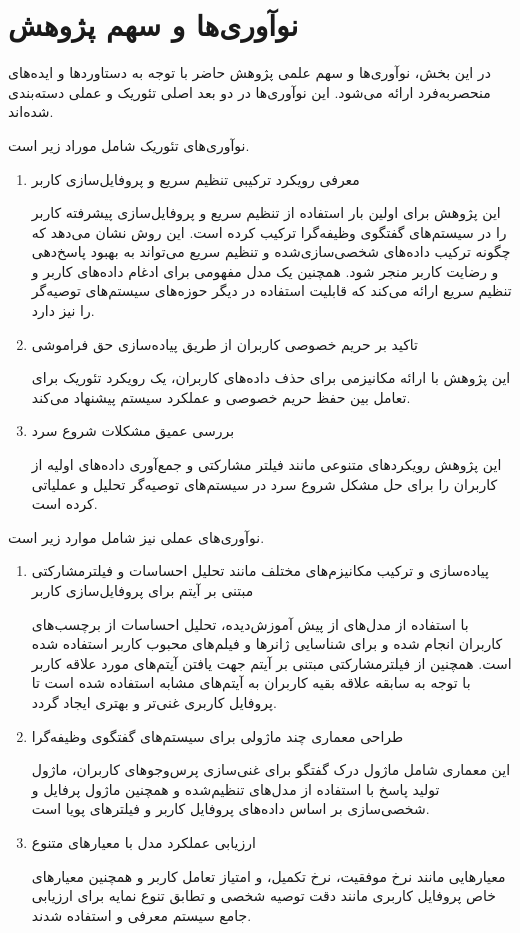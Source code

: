 \section{نوآوری‌ها و سهم پژوهش}

در این بخش، نوآوری‌ها و سهم علمی پژوهش حاضر با توجه به دستاوردها و ایده‌های منحصربه‌فرد ارائه می‌شود. این نوآوری‌ها در دو بعد اصلی تئوریک و عملی دسته‌بندی شده‌اند.


نوآوری‌های تئوریک شامل موراد زیر است.
\begin{enumerate}
\item
معرفی رویکرد ترکیبی تنظیم سریع و پروفایل‌سازی کاربر

این پژوهش برای اولین بار استفاده از تنظیم سریع و پروفایل‌سازی پیشرفته کاربر را در سیستم‌های گفتگوی وظیفه‌گرا ترکیب کرده است. این روش نشان می‌دهد که چگونه ترکیب داده‌های شخصی‌سازی‌شده و تنظیم سریع می‌تواند به بهبود پاسخ‌دهی و رضایت کاربر منجر شود. همچنین یک مدل مفهومی برای ادغام داده‌های کاربر و تنظیم سریع ارائه می‌کند که قابلیت استفاده در دیگر حوزه‌های سیستم‌های توصیه‌گر را نیز دارد.
\item
تاکید بر حریم خصوصی کاربران از طریق پیاده‌سازی حق فراموشی

این پژوهش با ارائه مکانیزمی برای حذف داده‌های کاربران، یک رویکرد تئوریک برای تعامل بین حفظ حریم خصوصی و عملکرد سیستم پیشنهاد می‌کند.

\item
بررسی عمیق مشکلات شروع سرد

این پژوهش رویکردهای متنوعی مانند فیلتر مشارکتی و جمع‌آوری داده‌های اولیه از کاربران را برای حل مشکل شروع سرد در سیستم‌های توصیه‌گر تحلیل و عملیاتی کرده است.
\end{enumerate}



نوآوری‌های عملی نیز شامل موارد زیر است.
\begin{enumerate}
\item
پیاده‌سازی و ترکیب مکانیزم‌های مختلف مانند تحلیل احساسات و فیلترمشارکتی مبتنی بر آیتم برای پروفایل‌سازی کاربر

با استفاده از مدل‌های از پیش آموزش‌دیده، تحلیل احساسات از برچسب‌های کاربران انجام شده و برای شناسایی ژانرها و فیلم‌های محبوب کاربر استفاده شده است. همچنین از فیلترمشارکتی مبتنی بر آیتم جهت یافتن آیتم‌های مورد علاقه کاربر با توجه به سابقه علاقه بقیه کاربران به آیتم‌های مشابه استفاده شده است تا پروفایل کاربری غنی‌تر و بهتری ایجاد گردد.

\item
طراحی معماری چند ماژولی برای سیستم‌های گفتگوی وظیفه‌گرا

این معماری شامل ماژول درک گفتگو برای غنی‌سازی پرس‌وجوهای کاربران، ماژول تولید پاسخ با استفاده از مدل‌های تنظیم‌شده و همچنین ماژول پرفایل و شخصی‌سازی بر اساس داده‌های پروفایل کاربر و فیلترهای پویا است.

\item
ارزیابی عملکرد مدل با معیارهای متنوع

معیارهایی مانند نرخ موفقیت، نرخ تکمیل، و امتیاز تعامل کاربر و همچنین معیارهای خاص پروفایل کاربری مانند دقت توصیه شخصی و تطابق تنوع نمایه برای ارزیابی جامع سیستم معرفی و استفاده شدند.
\end{enumerate}



